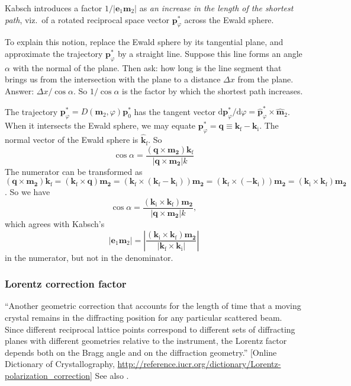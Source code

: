 \documentclass[11pt,a4paper]{article}
\def\v#1{\mathbf{#1}}
\begin{document}
Kabsch introduces a factor $1/|\v{e}_1\v{m}_2|$ as
\textit{an increase in the length of the shortest path},
viz.\ of a rotated reciprocal space vector $\v{p}^*_\varphi$ across the Ewald sphere.

To explain this notion,
replace the Ewald sphere by its tangential plane,
and approximate the trajectory $\v{p}^*_\varphi$ by a straight line.
Suppose this line forms an angle $\alpha$ with the normal of the plane.
Then ask: how long is the line segment that brings us from the intersection
with the plane to a distance $\Delta x$ from the plane.
Answer: $\Delta x/\cos\alpha$.
So $1/\cos\alpha$ is the factor by which the shortest path increases.

The trajectory $\v{p}^*_\varphi=D(\v{m}_2,\varphi)\v{p}^*_0$
has the tangent vector
$\mathrm{d}\v{p}^*_\varphi/\mathrm{d}\varphi=\v{\hat p}^*_\varphi\times\v{\hat m}_2$.
When it intersects the Ewald sphere,
we may equate $\v{p}^*_\varphi=\v{q}\equiv\v{k}_\text{f}-\v{k}_\text{i}$.
The normal vector of the Ewald sphere is $\v{\hat k}_\text{f}$.
So
\begin{equation}
  \cos\alpha = \frac{(\v{q}\times\v{m_2})\v{k}_\text{f}}{|\v{q}\times\v{m_2}| k}
\end{equation}
The numerator can be transformed as
$(\v{q}\times\v{m_2})\v{k}_\text{f}
=(\v{k}_\text{f}\times\v{q})\v{m_2}
=(\v{k}_\text{f}\times(\v{k}_\text{f}-\v{k}_\text{i}))\v{m_2}
=(\v{k}_\text{f}\times(-\v{k}_\text{i}))\v{m_2}
=(\v{k}_\text{i}\times\v{k}_\text{f})\v{m_2}$.
So we have
\begin{equation}
  \cos\alpha = \frac{(\v{k}_\text{i}\times\v{k}_\text{f})\v{m_2}}{|\v{q}\times\v{m_2}| k},
\end{equation}
which agrees with Kabsch's
\begin{equation}
  |\v{e}_1\v{m}_2|
  =\left|\frac{(\v{k}_\text{i}\times\v{k}_\text{f})\v{m_2}}{|\v{k}_\text{f}\times\v{k}_\text{i}|}\right|
\end{equation}
in the numerator, but not in the denominator.


\subsubsection{Lorentz correction factor}

``Another geometric correction that accounts for the length of time that a moving crystal remains in the diffracting position for any particular scattered beam. Since different reciprocal lattice points correspond to different sets of diffracting planes with different geometries relative to the instrument, the Lorentz factor depends both on the Bragg angle and on the diffraction geometry.''
[Online Dictionary of Crystallography,
\url{http://reference.iucr.org/dictionary/Lorentz-polarization_correction}]
See also \cite{Bue40}.



\end{document}
